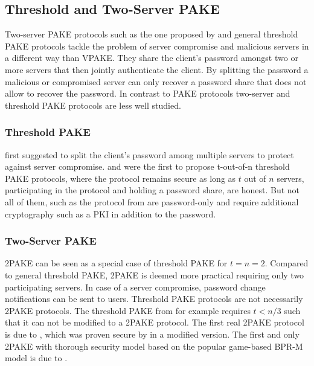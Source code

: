 \subsection{Threshold and Two-Server PAKE}
Two-server PAKE protocols such as the one proposed by \citet{Abdalla2005} and general threshold \ac{PAKE} protocols \cite{MacKenzieSJ02,RaimondoG03,Abdalla2005b} tackle the problem of server compromise and malicious servers in a different way than \ac{VPAKE}.
They share the client's password amongst two or more servers that then jointly authenticate the client.
By splitting the password a malicious or compromised server can only recover a password share that does not allow to recover the password.
In contrast to \ac{PAKE} protocols two-server and threshold \ac{PAKE} protocols are less well studied.

\subsubsection{Threshold PAKE}
\citet{FordK00} first suggested to split the client's password among multiple servers to protect against server compromise.
\citet{RaimondoG03} and \citet{MacKenzieSJ02} were the first to propose t-out-of-n threshold \ac{PAKE} protocols, where the protocol remains secure as long as $t$ out of $n$ servers, participating in the protocol and holding a password share, are honest.
But not all of them, such as the protocol from \citet{MacKenzieSJ02} are password-only and require additional cryptography such as a PKI in addition to the password.

\subsubsection{Two-Server PAKE}
\ac{2PAKE} can be seen as a special case of threshold PAKE for $t=n=2$.
Compared to  general threshold \ac{PAKE}, \ac{2PAKE} is deemed more practical requiring only two participating servers.
In case of a server compromise, password change notifications can be sent to users.
Threshold \ac{PAKE} protocols are not necessarily \ac{2PAKE} protocols.
The threshold \ac{PAKE} from \citet{RaimondoG03} for example requires $t<n/3$ such that it can not be modified to a \ac{2PAKE} protocol.
The first real \ac{2PAKE} protocol is due to \citet{BrainardJKS03}, which was proven secure by \citet{SzydloK05} in a modified version.
The first and only \ac{2PAKE} with thorough security model based on the popular game-based \ac{BPR-M} model is due to \citet{Katz2012a}.

